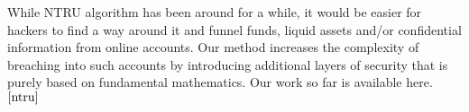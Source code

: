 \documentclass[a4paper,12pt]{article}
\begin{document}
\begin{flushleft}
    While NTRU algorithm has been around for a while, it would be easier for hackers to find a way around it and funnel funds, liquid assets and/or confidential information from online accounts. Our method increases the complexity of breaching into such accounts by introducing additional layers of security that is purely based on fundamental mathematics. Our work so far is available here.$^{\cite{ntru}}$
\end{flushleft}



\end{document}
